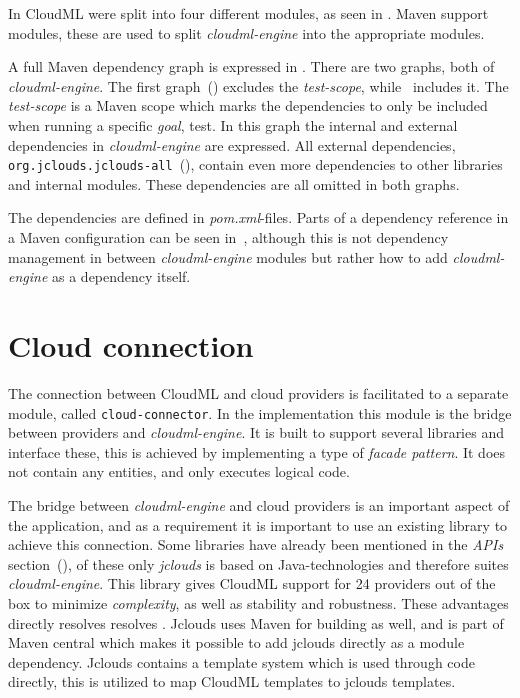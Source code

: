 In  CloudML were split into four different modules, as seen in .
Maven support modules, these are used to split \emph{cloudml-engine} into the appropriate 
modules.

A full Maven dependency graph is expressed in .
There are two graphs, both of \emph{cloudml-engine}.
The first graph~() excludes the \emph{test-scope},
while~ includes it.
The \emph{test-scope} is a Maven scope which marks the dependencies to only be included
when running a specific \emph{goal}, \eg test.
In this graph the internal and external dependencies in \emph{cloudml-engine} are expressed.
All external dependencies, 
\eg \texttt{org.jclouds.jclouds-all}~(),
contain even more dependencies to other libraries and internal modules.
These dependencies are all omitted in both graphs.

The dependencies are defined in \emph{pom.xml}-files.
Parts of a dependency reference in a Maven configuration can be seen in~,
although this is not dependency management in between \emph{cloudml-engine} modules but rather
how to add \emph{cloudml-engine} as a dependency itself.

\section{Cloud connection}

The connection between CloudML and cloud providers is facilitated 
to a separate module, called \texttt{cloud-connector}.
In the implementation this module is the bridge between providers and \emph{cloudml-engine}.
It is built to support several libraries and interface these,
this is achieved by implementing a type of \emph{facade pattern}.
It does not contain any entities, and only executes logical code. 

The bridge between \emph{cloudml-engine} and cloud providers is an important aspect of the application, 
and as a requirement it is important to use an existing library to achieve this connection.
Some libraries have already been mentioned in the \emph{APIs} section~(),
of these only \emph{jclouds} is based on Java-technologies and therefore suites \emph{cloudml-engine}.
This library gives CloudML support for 24 providers out of the box to minimize \emph{complexity},
as well as stability and robustness.
These advantages directly resolves resolves .
Jclouds uses Maven for building as well, and is part of Maven central which makes 
it possible to add jclouds directly as a module dependency.
Jclouds contains a template system which is used through code directly, this is utilized 
to map CloudML templates to jclouds templates.

